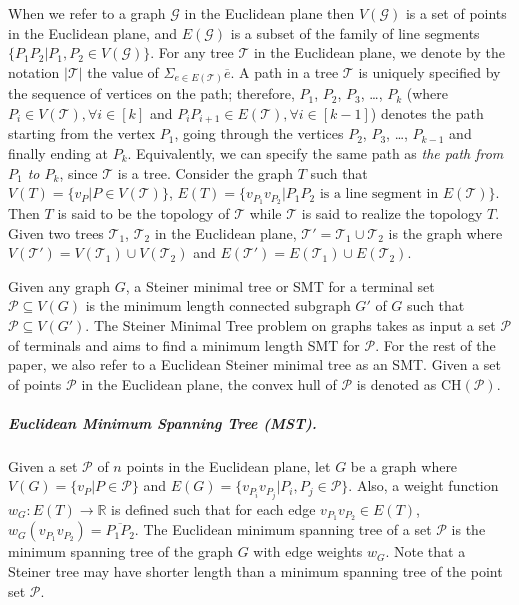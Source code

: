 When we refer to a graph $\mathcal{G}$ in the Euclidean plane then $V(\mathcal{G})$ is a set of points in the Euclidean plane, and $E(\mathcal{G})$ is a subset of the family of line segments $\{P_1P_2 | P_1,P_2 \in V(\mathcal{G})\}$. For any tree $\mathcal T$ in the Euclidean plane, we denote by the notation $|\mathcal T|$ the value of $\Sigma_{e \in E(\mathcal T)} \overline{e}$. A path in a tree $\mathcal T$ is uniquely specified by the sequence of vertices on the path; therefore, $P_1$, $P_2$, $P_3$, \ldots, $P_k$ (where $P_i \in V(\mathcal T), \forall i \in [k]$ and $P_iP_{i+1} \in E(\mathcal T), \forall i \in [k-1]$) denotes the path starting from the vertex $P_1$, going through the vertices $P_2$, $P_3$, \ldots, $P_{k-1}$ and finally ending at $P_k$. Equivalently, we can specify the same path as \emph{the path from $P_1$ to $P_k$}, since $\mathcal T$ is a tree. Consider the graph $T$ such that $V(T) = \{v_P| P \in V(\mathcal{T})\}$, $E(T) = \{v_{P_1}v_{P_2}| P_1P_2 \mbox{ is a line segment in } E(\mathcal{T})\}$. Then $T$ is said to be the topology of $\mathcal{T}$ while $\mathcal{T}$ is said to realize the topology $T$. Given two trees $\mathcal{T}_1$, $\mathcal{T}_2$ in the Euclidean plane, $\mathcal{T}' = \mathcal{T}_1\cup \mathcal{T}_2$ is the graph where $V(\mathcal{T}')= V(\mathcal{T}_1) \cup V(\mathcal{T}_2)$ and $E(\mathcal{T}')= E(\mathcal{T}_1) \cup E(\mathcal{T}_2)$. 

Given any graph $G$, a Steiner minimal tree or SMT for a terminal set $\mathcal{P} \subseteq V(G)$ is the minimum length connected subgraph $G'$ of $G$ such that $\mathcal{P} \subseteq V(G')$. The {\sc Steiner Minimal Tree} problem on graphs takes as input a set $\mathcal{P}$ of terminals and aims to find a minimum length SMT for $\mathcal{P}$. For the rest of the paper, we also refer to a Euclidean Steiner minimal tree as an SMT. Given a set of points $\mathcal{P}$ in the Euclidean plane, the convex hull of $\mathcal{P}$ is denoted as $\mathrm{CH(\mathcal P)}$.

\subparagraph{Euclidean Minimum Spanning Tree (MST).}
Given a set $\mathcal P$ of $n$ points in the Euclidean plane, let $G$ be a graph where $V(G) = \{v_P| P \in \mathcal P\}$ and $E(G) = \{v_{P_i}v_{P_j} | P_i,P_j \in \mathcal P\}$. Also, a weight function $w_{G}: E(T) \rightarrow \mathbb{R}$ is defined such that for each edge $v_{P_1}v_{P_2} \in E(T)$, $w_{G}(v_{P_1}v_{P_2}) = \overline{P_1P_2}$. The Euclidean minimum spanning tree of a set $\mathcal P$ is the minimum spanning tree of the graph $G$ with edge weights $w_G$. Note that a Steiner tree may have shorter length than a minimum spanning tree of the point set $\mathcal P$. 

